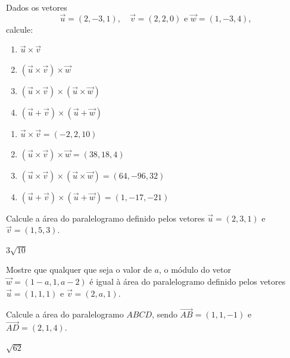 \documentclass[12pt]{exam}
\begin{document}
\begin{exercicio}
    Dados os vetores
    \[
        \vec{u} = (2,-3,1),\quad \vec{v} = (2,2,0) \text{ e } \vec{w} = (1,-3,4),
    \]
    calcule:
    \begin{enumerate}[label=({\alph*})]
        \item $\vec{u}\times\vec{v}$
        \item $(\vec{u}\times\vec{v})\times\vec{w}$
        \item $(\vec{u}\times\vec{v})\times(\vec{u}\times\vec{w})$
        \item $(\vec{u} + \vec{v})\times(\vec{u} + \vec{w})$
    \end{enumerate}
    \begin{solucao}
        \begin{enumerate}[label=({\alph*})]
            \item $\vec{u}\times\vec{v} = (-2,2,10)$
            \item $(\vec{u}\times\vec{v})\times\vec{w} = (38,18,4)$
            \item $(\vec{u}\times\vec{v})\times(\vec{u}\times\vec{w}) = (64,-96,32)$
            \item $(\vec{u} + \vec{v})\times(\vec{u} + \vec{w}) = (1,-17,-21)$
        \end{enumerate}
    \end{solucao}
\end{exercicio}

\begin{exercicio}
    Calcule a área do paralelogramo definido pelos vetores $\vec{u} = (2,3,1)$ e $\vec{v} = (1,5,3)$.
    \begin{solucao}
        $3\sqrt{10}$
    \end{solucao}
\end{exercicio}

\begin{exercicio}
    Mostre que qualquer que seja o valor de $a$, o módulo do vetor $\vec{w} = (1 - a, 1, a - 2)$ é igual à área do paralelogramo definido pelos vetores $\vec{u} = (1,1,1)$ e $\vec{v} = (2,a,1)$.
\end{exercicio}

\begin{exercicio}
    Calcule a área do paralelogramo $ABCD$, sendo $\vec{AB} = (1,1,-1)$ e $\vec{AD} = (2,1,4)$.
    \begin{solucao}
        $\sqrt{62}$
    \end{solucao}
\end{exercicio}
\end{document}
